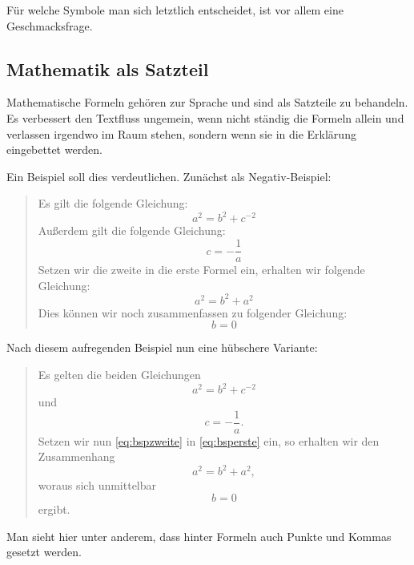 Für welche Symbole man sich letztlich entscheidet, ist vor allem eine Geschmacksfrage.

\subsection{Mathematik als Satzteil}
Mathematische Formeln gehören zur Sprache und sind als Satzteile zu behandeln. Es verbessert den Textfluss ungemein, wenn nicht ständig die Formeln allein und verlassen irgendwo im Raum stehen, sondern wenn sie in die Erklärung eingebettet werden.

Ein Beispiel soll dies verdeutlichen. Zunächst als Negativ-Beispiel:
\begin{quote}
	Es gilt die folgende Gleichung:
	\begin{equation}
		a^2=b^2+c^{-2}
	\end{equation}
	Außerdem gilt die folgende Gleichung:
	\begin{equation}
		c=-\frac 1a
	\end{equation}
	Setzen wir die zweite in die erste Formel ein, erhalten wir folgende Gleichung:
	\begin{equation}
		a^2=b^2+a^2
	\end{equation}
	Dies können wir noch zusammenfassen zu folgender Gleichung:
	\begin{equation}
		b=0
	\end{equation}
\end{quote}

Nach diesem aufregenden Beispiel nun eine hübschere Variante:
\begin{quote}
	Es gelten die beiden Gleichungen
	\begin{equation}\label{eq:bsperste}
		a^2=b^2+c^{-2}
	\end{equation}
	und
	\begin{equation}\label{eq:bspzweite}
		c=-\frac 1a.
	\end{equation}
	Setzen wir nun \eqref{eq:bspzweite} in \eqref{eq:bsperste} ein, so erhalten wir den Zusammenhang
	\begin{equation}
		a^2=b^2+a^2,
	\end{equation}
	woraus sich unmittelbar
	\begin{equation}
		b=0
	\end{equation}
	ergibt.
\end{quote}

Man sieht hier unter anderem, dass hinter Formeln auch Punkte und Kommas gesetzt werden.
%
%
